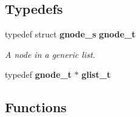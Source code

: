 \subsection*{Typedefs}
\begin{DoxyCompactItemize}
\item 
\mbox{\label{glist_8h_a35eee566c2974c9a3e3055daf1611793}} 
typedef struct \textbf{ gnode\+\_\+s} \textbf{ gnode\+\_\+t}
\begin{DoxyCompactList}\small\item\em A node in a generic list. \end{DoxyCompactList}\item 
\mbox{\label{glist_8h_a576a9ce77a5af8b912e75b32bce607f2}} 
typedef \textbf{ gnode\+\_\+t} $\ast$ {\bfseries glist\+\_\+t}
\end{DoxyCompactItemize}
\subsection*{Functions}

